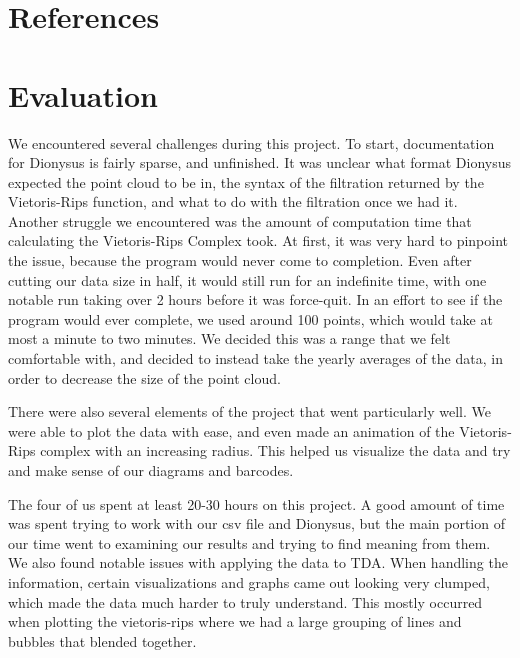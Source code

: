 \documentclass[12pt]{report}
\begin{document}
\section*{References}

\clearpage
\section*{Evaluation}
We encountered several challenges during this project. To start, documentation for Dionysus is fairly sparse, and unfinished. It was unclear what format Dionysus expected the point cloud to be in, the syntax of the filtration returned by the Vietoris-Rips function, and what to do with the filtration once we had it. Another struggle we encountered was the amount of computation time that calculating the Vietoris-Rips Complex took. At first, it was very hard to pinpoint the issue, because the program would never come to completion. Even after cutting our data size in half, it would still run for an indefinite time, with one notable run taking over 2 hours before it was force-quit. In an effort to see if the program would ever complete, we used around 100 points, which would take at most a minute to two minutes. We decided this was a range that we felt comfortable with, and decided to instead take the yearly averages of the data, in order to decrease the size of the point cloud.\par 
There were also several elements of the project that went particularly well. We were able to plot the data with ease, and even made an animation of the Vietoris-Rips complex with an increasing radius. This helped us visualize the data and try and make sense of our diagrams and barcodes. \par
The four of us spent at least 20-30 hours on this project. A good amount of time was spent trying to work with our csv file and Dionysus, but the main portion of our time went to examining our results and trying to find meaning from them. We also found notable issues with applying the data to TDA. When handling the information, certain visualizations and graphs came out looking very clumped, which made the data much harder to truly understand. This mostly occurred when plotting the vietoris-rips where we had a large grouping of lines and bubbles that blended together. \par

\clearpage
\end{document}
